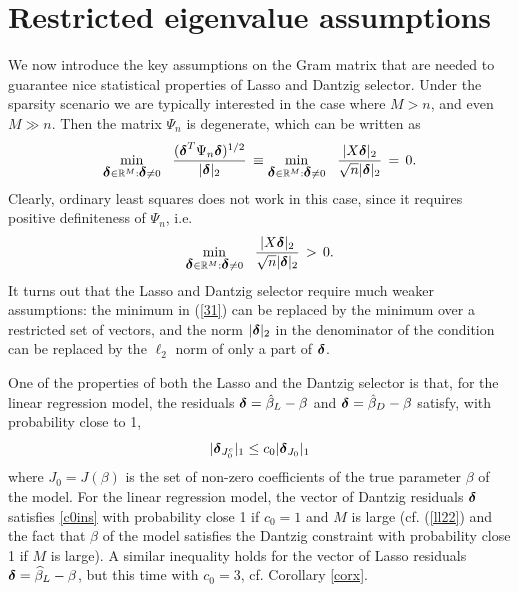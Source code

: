 \documentclass[dvips,aos]{imsart}
\numberwithin{equation}{section}
\theoremstyle{plain}
\def\wh{\widehat}
\def\RR{\mathbb R}
\newcommand{\bD}{\mbox{\boldmath$\delta$}}
\begin{document}
\section{Restricted eigenvalue assumptions}\label{sec2}



We now introduce the key assumptions on the Gram matrix that are
needed to guarantee nice statistical properties of Lasso and Dantzig
selector. Under the sparsity scenario we are typically interested in
the case where $M>n$, and even $M\gg n$. Then the matrix $\Psi_n$ is
degenerate, which can be written as
$$
\min_{\bD\in \RR^M: \bD \neq 0} \ \
\frac{(\bD^T\Psi_{n}\bD)^{1/2}}{|\bD|_2} \, \equiv
 \min_{\bD\in \RR^M: \bD \neq 0}
%
\ \ \frac{|X\bD|_2}{\sqrt{n}|\bD|_2} \,= \, 0.
$$
Clearly,  ordinary least squares does not work in this case,
since it requires positive definiteness of $\Psi_n$, i.e.
\begin{equation}\label{31}
\min_{\bD\in \RR^M: \bD \neq 0}
%
\ \ \frac{|X\bD|_2}{\sqrt{n}|\bD|_2} \,> \, 0.
\end{equation}
It turns out that the Lasso and Dantzig selector require much weaker
assumptions: the minimum  in (\ref{31}) can be replaced by
the minimum over a restricted set of vectors, and the norm  $|\bD|_2$ in
the denominator of the condition can be replaced by the $\ell_2$ norm of only a part of $\bD$.


One of the properties of both the Lasso and the Dantzig selector is
that, for the linear regression model, the residuals $\bD=\hat
\beta_L-\beta$ and $\bD=\hat \beta_D-\beta$ satisfy, with
probability close to 1,
\begin{equation}
\label{c0ins} |\bD_{J_0^c}|_1\leq c_0|\bD_{J_0}|_1
\end{equation}
where $J_0=J(\beta)$ is the set of non-zero coefficients of the true
parameter $\beta$ of the model. For the linear regression model, the
vector of Dantzig residuals $\bD$ satisfies \eqref{c0ins} with
probability close 1 if $c_0=1$ and $M$ is large (cf. (\ref{ll22})
and the fact that $\beta$ of the model satisfies the Dantzig
constraint with probability close 1 if $M$ is large). A similar
inequality holds for the vector of Lasso residuals $\bD=\wh \beta_L
- \beta$, but this time with $c_0=3$, cf. Corollary \ref{corx}.
\end{document}

